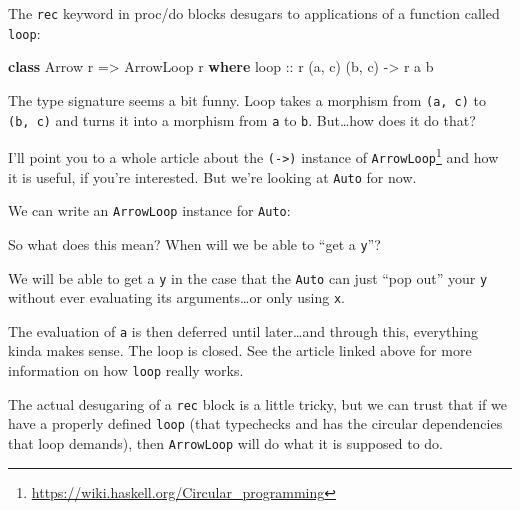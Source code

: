 \documentclass[]{article}
\newenvironment{Shaded}{}{}
\newcommand{\KeywordTok}[1]{\textcolor[rgb]{0.00,0.44,0.13}{\textbf{{#1}}}}
\newcommand{\DataTypeTok}[1]{\textcolor[rgb]{0.56,0.13,0.00}{{#1}}}
\newcommand{\CommentTok}[1]{\textcolor[rgb]{0.38,0.63,0.69}{\textit{{#1}}}}
\newcommand{\OtherTok}[1]{\textcolor[rgb]{0.00,0.44,0.13}{{#1}}}
\newcommand{\FunctionTok}[1]{\textcolor[rgb]{0.02,0.16,0.49}{{#1}}}
\newcommand{\NormalTok}[1]{{#1}}
\renewcommand{\href}[2]{#2\footnote{\url{#1}}}
\begin{document}
The \texttt{rec} keyword in proc/do blocks desugars to applications of a
function called \texttt{loop}:

\begin{Shaded}
\begin{Highlighting}[]
\KeywordTok{class} \DataTypeTok{Arrow} \NormalTok{r }\OtherTok{=>} \DataTypeTok{ArrowLoop} \NormalTok{r }\KeywordTok{where}
\OtherTok{    loop ::} \NormalTok{r (a, c) (b, c) }\OtherTok{->} \NormalTok{r a b}
\end{Highlighting}
\end{Shaded}

The type signature seems a bit funny. Loop takes a morphism from
\texttt{(a,\ c)} to \texttt{(b,\ c)} and turns it into a morphism from
\texttt{a} to \texttt{b}. But\ldots{}how does it do that?

I'll point you to \href{https://wiki.haskell.org/Circular_programming}{a
whole article about the \texttt{(-\textgreater{})} instance of
\texttt{ArrowLoop}} and how it is useful, if you're interested. But
we're looking at \texttt{Auto} for now.

We can write an \texttt{ArrowLoop} instance for \texttt{Auto}:

\begin{Shaded}
\end{Shaded}

So what does this mean? When will we be able to ``get a \texttt{y}''?

We will be able to get a \texttt{y} in the case that the \texttt{Auto}
can just ``pop out'' your \texttt{y} without ever evaluating its
arguments\ldots{}or only using \texttt{x}.

The evaluation of \texttt{a\textquotesingle{}} is then deferred until
later\ldots{}and through this, everything kinda makes sense. The loop is
closed. See the article linked above for more information on how
\texttt{loop} really works.

The actual desugaring of a \texttt{rec} block is a little tricky, but we
can trust that if we have a properly defined \texttt{loop} (that
typechecks and has the circular dependencies that loop demands), then
\texttt{ArrowLoop} will do what it is supposed to do.
\end{document}
